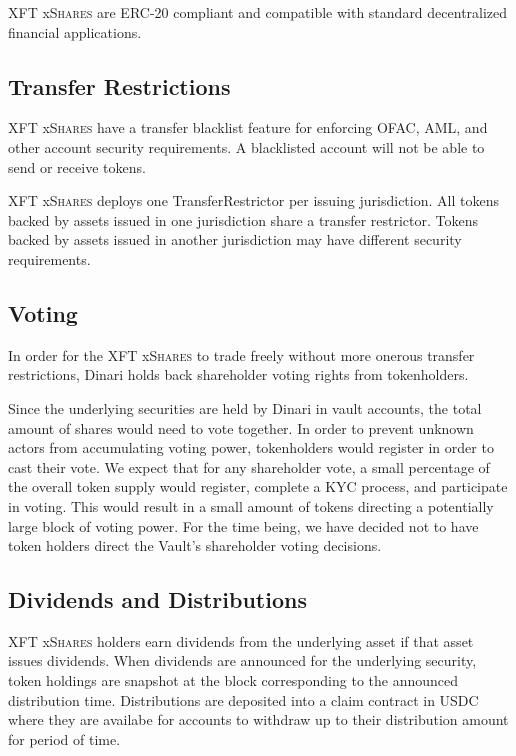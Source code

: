 \documentclass[sigconf,nonacm,prologue,table]{acmart}
\newcommand{\dshares}{\textsc{XFT} x\textsc{Shares} }
\begin{document}
\dshares are ERC-20 compliant and compatible with standard decentralized financial applications.

\subsection{Transfer Restrictions}

\dshares have a transfer blacklist feature for enforcing OFAC, AML, and other account security requirements. A blacklisted account will not be able to send or receive tokens.

\dshares deploys one TransferRestrictor per issuing jurisdiction. All tokens backed by assets issued in one jurisdiction share a transfer restrictor. Tokens backed by assets issued in another jurisdiction may have different security requirements.

\subsection{Voting}

In order for the \dshares to trade freely without more onerous transfer restrictions, Dinari holds back shareholder voting rights from tokenholders.

Since the underlying securities are held by Dinari in vault accounts, the total amount of shares would need to vote together. In order to prevent unknown actors from accumulating voting power, tokenholders would register in order to cast their vote. We expect that for any shareholder vote, a small percentage of the overall token supply would register, complete a KYC process, and participate in voting. This would result in a small amount of tokens directing a potentially large block of voting power. For the time being, we have decided not to have token holders direct the Vault’s shareholder voting decisions.

\subsection{Dividends and Distributions}

\dshares holders earn dividends from the underlying asset if that asset issues dividends. When dividends are announced for the underlying security, token holdings are snapshot at the block corresponding to the announced distribution time. Distributions are deposited into a claim contract in USDC where they are availabe for accounts to withdraw up to their distribution amount for period of time.
\end{document}
